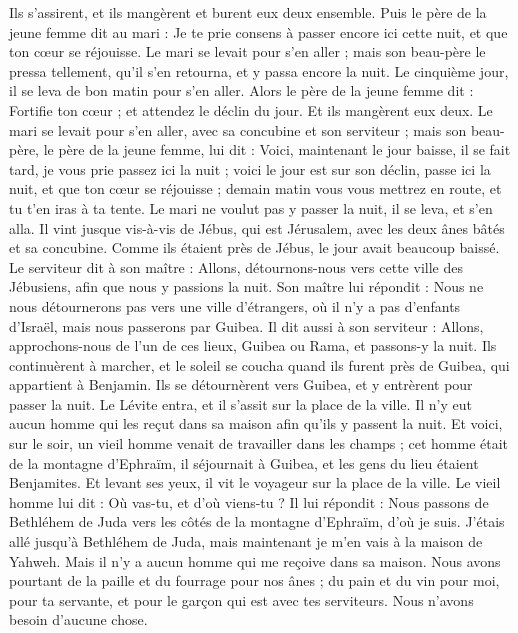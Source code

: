 \begin{multicols}{2}
Ils s'assirent, et ils mangèrent et burent eux deux ensemble. Puis le père de la jeune femme dit au mari : Je te prie consens à passer encore ici cette nuit, et que ton cœur se réjouisse.
Le mari se levait pour s'en aller ; mais son beau-père le pressa tellement, qu'il s'en retourna, et y passa encore la nuit.
Le cinquième jour, il se leva de bon matin pour s'en aller. Alors le père de la jeune femme dit : Fortifie ton cœur ; et attendez le déclin du jour. Et ils mangèrent eux deux.
Le mari se levait pour s'en aller, avec sa concubine et son serviteur ; mais son beau-père, le père de la jeune femme, lui dit : Voici, maintenant le jour baisse, il se fait tard, je vous prie passez ici la nuit ; voici le jour est sur son déclin, passe ici la nuit, et que ton cœur se réjouisse ; demain matin vous vous mettrez en route, et tu t'en iras à ta tente.
Le mari ne voulut pas y passer la nuit, il se leva, et s'en alla.  Il vint jusque vis-à-vis de Jébus, qui est Jérusalem, avec les deux ânes bâtés et sa concubine.
Comme ils étaient près de Jébus, le jour avait beaucoup baissé. Le serviteur dit à son maître : Allons, détournons-nous vers cette ville des Jébusiens, afin que nous y passions la nuit.
Son maître lui répondit : Nous ne nous détournerons pas vers une ville d'étrangers, où il n'y a pas d'enfants d'Israël, mais nous passerons par Guibea.
Il dit aussi à son serviteur : Allons, approchons-nous de l'un de ces lieux, Guibea ou Rama, et passons-y la nuit.
Ils continuèrent à marcher, et le soleil se coucha quand ils furent près de Guibea, qui appartient à Benjamin.
Ils se détournèrent vers Guibea, et y entrèrent pour passer la nuit. Le Lévite entra, et il s'assit sur la place de la ville. Il n'y eut aucun homme qui les reçut dans sa maison afin qu'ils y passent la nuit.
Et voici, sur le soir, un vieil homme venait de travailler dans les champs ; cet homme était de la montagne d'Ephraïm, il séjournait à Guibea, et les gens du lieu étaient Benjamites.
Et levant ses yeux, il vit le voyageur sur la place de la ville. Le vieil homme lui dit : Où vas-tu, et d'où viens-tu ?
Il lui répondit : Nous passons de Bethléhem de Juda vers les côtés de la montagne d'Ephraïm, d'où je suis. J'étais allé jusqu'à Bethléhem de Juda, mais maintenant je m'en vais à la maison de Yahweh. Mais il n'y a aucun homme qui me reçoive dans sa maison.
Nous avons pourtant de la paille et du fourrage pour nos ânes ; du pain et du vin pour moi,  pour ta servante, et pour le garçon qui est avec tes serviteurs. Nous n'avons besoin d'aucune chose.

\end{multicols}
